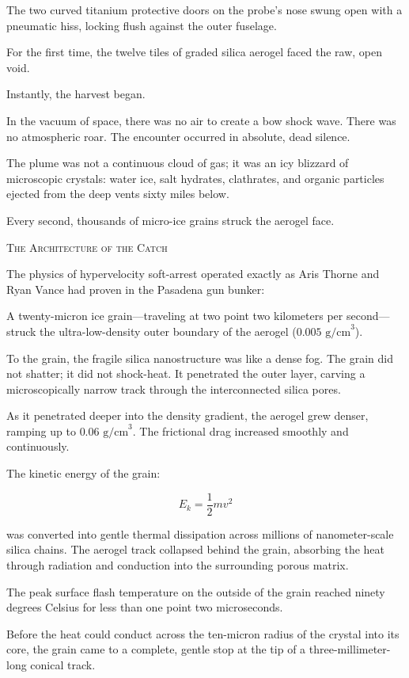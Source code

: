 \documentclass[12pt,twoside,openright]{book}
\newcommand{\sceneheader}[1]{%
  \par\vspace{1.8em}%
  {\noindent\centering\scshape\large #1\par}%
  \vspace{1.0em}%
  \noindent%
}
\newcommand{\dinkus}{%
  \par\vspace{1.2em}%
  {\noindent\centering{\large $\ast\quad\ast\quad\ast$}\par}%
  \vspace{1.2em}%
  \noindent%
}
\begin{document}
The two curved titanium protective doors on the probe's nose swung open
with a pneumatic hiss, locking flush against the outer fuselage.

For the first time, the twelve tiles of graded silica aerogel faced the
raw, open void.

Instantly, the harvest began.

In the vacuum of space, there was no air to create a bow shock wave.
There was no atmospheric roar. The encounter occurred in absolute, dead
silence.

The plume was not a continuous cloud of gas; it was an icy blizzard of
microscopic crystals: water ice, salt hydrates, clathrates, and organic
particles ejected from the deep vents sixty miles below.

Every second, thousands of micro-ice grains struck the aerogel face.

\dinkus

\sceneheader{The Architecture of the
Catch}

The physics of hypervelocity soft-arrest operated exactly as Aris Thorne
and Ryan Vance had proven in the Pasadena gun bunker:

A twenty-micron ice grain---traveling at two point two kilometers per
second---struck the ultra-low-density outer boundary of the aerogel
(\(0.005\text{ g/cm}^3\)).

To the grain, the fragile silica nanostructure was like a dense fog. The
grain did not shatter; it did not shock-heat. It penetrated the outer
layer, carving a microscopically narrow track through the interconnected
silica pores.

As it penetrated deeper into the density gradient, the aerogel grew
denser, ramping up to \(0.06\text{ g/cm}^3\). The frictional drag
increased smoothly and continuously.

The kinetic energy of the grain:

\[E_k = \frac{1}{2} m v^2\]

was converted into gentle thermal dissipation across millions of
nanometer-scale silica chains. The aerogel track collapsed behind the
grain, absorbing the heat through radiation and conduction into the
surrounding porous matrix.

The peak surface flash temperature on the outside of the grain reached
ninety degrees Celsius for less than one point two microseconds.

Before the heat could conduct across the ten-micron radius of the
crystal into its core, the grain came to a complete, gentle stop at the
tip of a three-millimeter-long conical track.
\end{document}
